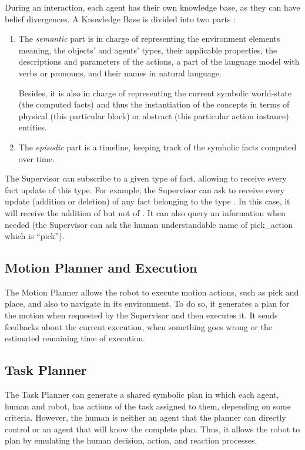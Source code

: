\documentclass[a4paper,11pt,twoside]{StyleThese}
\begin{document}
During an interaction, each agent has their own knowledge base, as they can have belief divergences. A Knowledge Base is divided into two parts :
\begin{enumerate}
	\item The \textit{semantic} part is in charge of representing the environment elements meaning, the objects' and agents' types, their applicable properties, the descriptions and parameters of the actions, a part of the language model with verbs or pronouns, and their names in natural language. 
	
	Besides, it is also in charge of representing the current symbolic world-state (the computed facts) and thus the instantiation of the concepts in terms of physical (\eg this particular block) or abstract (\eg this particular action instance) entities.
	\item  The \textit{episodic} part is a timeline, keeping track of the symbolic facts computed over time.
\end{enumerate}

The Supervisor can subscribe to a given type of fact, allowing to receive every fact update of this type. For example, the Supervisor can ask to receive every update (addition or deletion) of any fact belonging to the type . In this case, it will receive the addition of  but not of . It can also query an information when needed (\eg the Supervisor can ask the human understandable name of pick\_action which is ``pick'').

\subsection{Motion Planner and Execution}
The Motion Planner allows the robot to execute motion actions, such as pick and place, and also to navigate in its environment. To do so, it generates a plan for the motion when requested by the Supervisor and then executes it. It sends feedbacks about the current execution, \eg when something goes wrong or the estimated remaining time of execution.

\subsection{Task Planner}
The Task Planner can generate a shared symbolic plan in which each agent, human and robot, has actions of the task assigned to them, depending on some criteria. However, the human is neither an agent that the planner can directly control or an agent that will know the complete plan. Thus, it allows the robot to plan by emulating the human decision, action, and reaction processes. 
\end{document}
